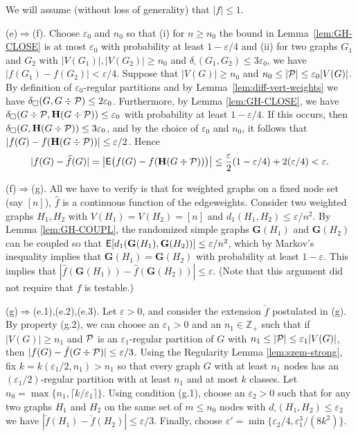 \documentclass[12pt]{article}
\numberwithin{equation}{section}
\def\eps{\varepsilon}
\def\iv{\widehat}
\def\E{{\sf E}}
\def\bG{{\mathbf G}}
\def\bH{{\mathbf H}}
\def\Z{{\mathbb Z}}
\def\PP{{\cal P}}\def\QQ{{\cal Q}}\def\RR{{\cal R}}
\begin{document}
We will assume (without loss of generality) that $|f|\leq 1$.

(e)$\Rightarrow$(f). Choose $\eps_0$ and $n_0$ so that (i) for
$n\geq n_0$ the bound in Lemma~\ref{lem:GH-CLOSE} is {at most
$\eps_0$ with probability at least $1-\eps/4$} and (ii) for two
graphs $G_1$ and $G_2$ with $|V(G_1)|,|V(G_2)|\ge n_0$ and
$\delta_\square(G_1,G_2)\leq 3\eps_0$, we have
$|f(G_1)-f(G_2)|<\eps/4$. Suppose that $|V(G)|\geq n_0$ and
$n_0\leq|\PP|\leq \eps_0 |V(G)|$. By definition of $\eps_0$-regular
partitions and by Lemma~\ref{lem:diff-vert-weights} we have
$\delta_\square(G,G\div\PP)\le 2\eps_0$. Furthermore, by Lemma
\ref{lem:GH-CLOSE}, we have
$\delta_\square(G\div\PP,\bH(G\div\PP))\le \eps_0$ with probability
at least $1-\eps/4$. If this occurs, then
$\delta_\square(G,\bH(G\div\PP))\le 3\eps_0$, and by the choice of
$\eps_0$ and $n_0$, it follows that $|f(G)-f(\bH(G\div\PP))|\le
\eps/2$. Hence
\[
|f(G)-\iv{f}(G)|=\bigl|\E\bigl(f(G)-f(\bH(G\div\PP))\bigr)\bigr| \le
\frac \eps 2(1-\eps/4) + {2}(\eps/4)<\eps.
\]

\medskip

(f)$\Rightarrow$(g). All we have to verify is that for weighted
graphs on a fixed node set (say $[n]$), $\iv{f}$ is a continuous
function of the edgeweights. Consider two weighted graphs $H_1,H_2$
with $V(H_1)=V(H_2)=[n]$ and $d_1(H_1,H_2)\le \eps/n^2$. By Lemma
\ref{lem:GH-COUPL}, the randomized simple graphs $\bG(H_1)$ and
$\bG(H_2)$ can be coupled so that $\E [d_1(\bG(H_1),\bG(H_2))]\le
\eps/n^2$, which by Markov's inequality implies that
$\bG(H_1)=\bG(H_2)$ with probability at least $1-\eps$. This implies
that $|\iv{f}(\bG(H_1))-\iv{f}(\bG(H_2))|\le \eps$. (Note that this
argument did not require that $f$ is testable.)

\medskip

(g)$\Rightarrow$(e.1),(e.2),(e.3). Let $\eps>0$, and consider the
extension $\check{f}$ postulated in (g). By property (g.2), we can
choose an $\eps_1>0$ and an $n_1\in\Z_+$ such that if $|V(G)|\ge n_1$
and $\PP$ is an $\eps_1$-regular partition of $G$ with $n_1\leq
|\PP|\leq\eps_1 |V(G)|$, then $|f(G)-\check{f}(G\div\PP)|\le\eps/3$.
Using the Regularity Lemma \ref{lem:szem-strong}, fix $k=
k(\eps_1/2,n_1)>n_1$ so that every graph $G$ with at least $n_1$
nodes has an $(\eps_1/2)$-regular partition with at least $n_1$ and
at most $k$ classes. Let $n_0=\max\{n_1,\lceil k/\eps_1\rceil\}$.
Using condition (g.1), choose an $\eps_2>0$ such that for any two
graphs $H_1$ and $H_2$ on the same set of $m\le n_0$ nodes with
$d_\square(H_1,H_2)\le\eps_2$ we have
$|\check{f}(H_1)-\check{f}(H_2)|\le\eps/3$. Finally, choose
$\eps'=\min\{\eps_2/4, \eps_1^3/(8k^2)\}$.
\end{document}
